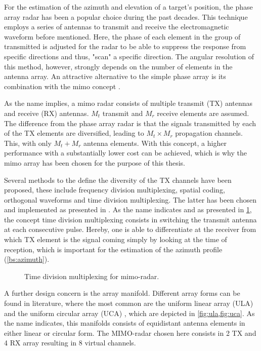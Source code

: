 For the estimation of the azimuth and elevation of a target's position, the phase array radar has been a popular choice during the past decades. This technique employs a series of antennas to transmit and receive the electromagnetic waveform before mentioned. Here, the phase of each element in the group of transmitted is adjusted for the radar to be able to suppress the response from specific directions and thus, "scan" a specific direction. The angular resolution of this method, however, strongly depends on the number of elements in the antenna array. An attractive alternative to the simple phase array is its combination with the \ac{mimo} concept \cite{fishler_mimo_2004}. 

As the name implies, a \ac{mimo} radar consists of multiple transmit (TX) antennas and receive (RX) antennas. $M_t$ transmit and $M_r$ receive elements are assumed. The difference from the phase array radar is that the signals transmitted by each of the TX elements are diversified, leading to $M_t\times M_r$ propagation channels. This, with only $M_t + M_r$ antenna elements. With this concept, a higher performance with a substantially lower cost can be achieved, which is why the \ac{mimo} array has been chosen for the purpose of this thesis. 

Several methods to the define the diversity of the TX channels have been proposed, these include frequency division multiplexing, spatial coding, orthogonal waveforms and time division multiplexing. The latter has been chosen and implemented as presented in \cite{huang_fmcw_2011}. As the name indicates and as presented in \cref{fig:tdm}, the concept time division multiplexing consists in switching the transmit antenna at each consecutive pulse. Hereby, one is able to differentiate at the receiver from which TX element is the signal coming simply by looking at the time of reception, which is important for the estimation of the azimuth profile (\cref{bs:azimuth}).


\begin{figure}[h!]
	\centering
	
	\caption{Time division multiplexing for \Ac{mimo}-radar.}
	\label{fig:tdm}
\end{figure} 


A further design concern is the array manifold. Different array forms can be found in literature, where the most common are the uniform linear array (ULA) and the uniform circular array (UCA) \cite{zhang_blind_2009}, which are depicted in \cref{fig:ula,fig:uca}. As the name indicates, this manifolds consists of equidistant antenna elements in either linear or circular form. The MIMO-radar chosen here consists in 2 TX and 4 RX array resulting in 8 virtual channels.

